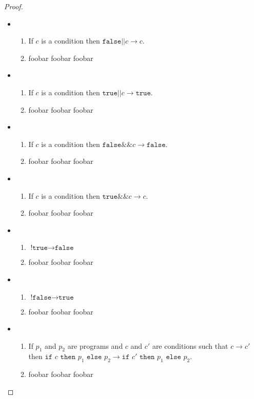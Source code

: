 \documentclass[11pt]{article}
\begin{document}
\begin{proof}
\begin{itemize}
\item
\begin{enumerate}
\item If $c$ is a condition then $\texttt{false||} c \rightarrow c$.
\item foobar foobar foobar
\end{enumerate}

\item
\begin{enumerate}
\item If $c$ is a condition then $\texttt{true||} c \rightarrow \texttt{true}$.
\item foobar foobar foobar
\end{enumerate}

\item
\begin{enumerate}
\item If $c$ is a condition then $\texttt{false\&\&} c \rightarrow \texttt{false}$.
\item foobar foobar foobar
\end{enumerate}

\item
\begin{enumerate}
\item If $c$ is a condition then $\texttt{true\&\&} c \rightarrow c$.
\item foobar foobar foobar
\end{enumerate}

\item
\begin{enumerate}
\item $\texttt{!true} \rightarrow \texttt{false}$
\item foobar foobar foobar
\end{enumerate}

\item
\begin{enumerate}
\item $\texttt{!false} \rightarrow \texttt{true}$
\item foobar foobar foobar
\end{enumerate}

\item
\begin{enumerate}
\item If $p_{1}$ and $p_{2}$ are programs and $c$ and $c'$ are conditions such that $c \rightarrow c'$ then $\texttt{if } c \texttt{ then } p_{1} \texttt{ else } p_{2} \rightarrow \texttt{if } c' \texttt{ then } p_{1} \texttt{ else } p_{2}$.
\item foobar foobar foobar
\end{enumerate}


\end{itemize}
\end{proof}
\end{document}
